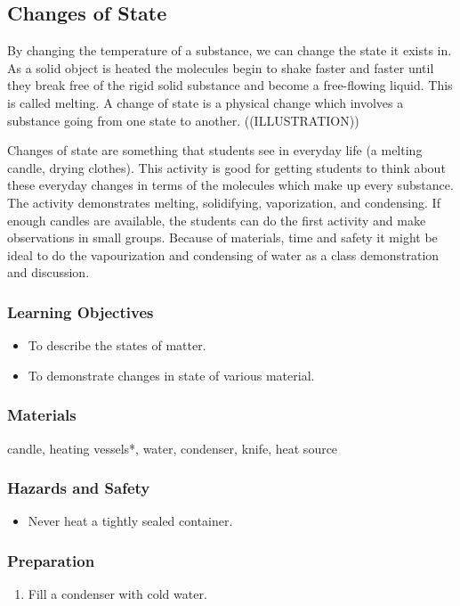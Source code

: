 \subsection{Changes of State}
By changing the temperature of a substance, we can change the state it exists in. As a solid object is heated the molecules begin to shake faster and faster until they break free of the rigid solid substance and become a free-flowing liquid. This is called melting. A change of state is a physical change which involves a substance going from one state to another. 
((ILLUSTRATION))

Changes of state are something that students see in everyday life (a melting candle, drying clothes). This activity is good for getting students to think about these everyday changes in terms of the molecules which make up every substance. The activity demonstrates melting, solidifying, vaporization, and condensing. If enough candles are available, the students can do the first activity and make observations in small groups. Because of materials, time and safety it might be ideal to do the vapourization and condensing of water as a class demonstration and discussion.

\subsubsection*{Learning Objectives}
\begin{itemize}
\item{To describe the states of matter.}
\item{To demonstrate changes in state of various material.}
\end{itemize}

\subsubsection*{Materials}
candle, heating vessels*, water, condenser, knife, heat source

\subsubsection*{Hazards and Safety}
\begin{itemize}
\item{Never heat a tightly sealed container.}
\end{itemize}

\subsubsection*{Preparation}
\begin{enumerate}
\item{Fill a condenser with cold water.}
\end{enumerate}

